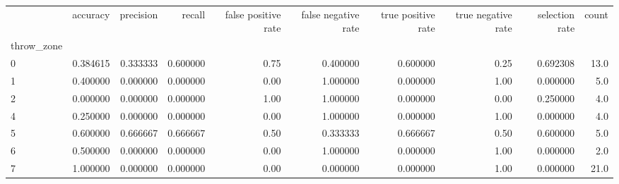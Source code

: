 \begin{tabular}{lrrrrrrrrr}
\toprule
{} &  accuracy &  precision &    recall &  false positive rate &  false negative rate &  true positive rate &  true negative rate &  selection rate &  count \\
throw\_zone &           &            &           &                      &                      &                     &                     &                 &        \\
\midrule
0          &  0.384615 &   0.333333 &  0.600000 &                 0.75 &             0.400000 &            0.600000 &                0.25 &        0.692308 &   13.0 \\
1          &  0.400000 &   0.000000 &  0.000000 &                 0.00 &             1.000000 &            0.000000 &                1.00 &        0.000000 &    5.0 \\
2          &  0.000000 &   0.000000 &  0.000000 &                 1.00 &             1.000000 &            0.000000 &                0.00 &        0.250000 &    4.0 \\
4          &  0.250000 &   0.000000 &  0.000000 &                 0.00 &             1.000000 &            0.000000 &                1.00 &        0.000000 &    4.0 \\
5          &  0.600000 &   0.666667 &  0.666667 &                 0.50 &             0.333333 &            0.666667 &                0.50 &        0.600000 &    5.0 \\
6          &  0.500000 &   0.000000 &  0.000000 &                 0.00 &             1.000000 &            0.000000 &                1.00 &        0.000000 &    2.0 \\
7          &  1.000000 &   0.000000 &  0.000000 &                 0.00 &             0.000000 &            0.000000 &                1.00 &        0.000000 &   21.0 \\
\bottomrule
\end{tabular}
